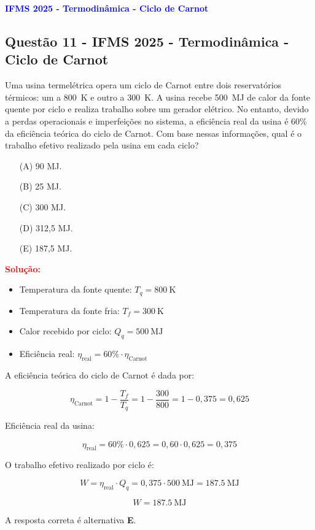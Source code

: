 \begin{flushleft}
\textbf{\textcolor{blue}{\Large IFMS 2025 - Termodinâmica - Ciclo de Carnot}}\\
\noindent

\subsection{Quest\~ao 11 - IFMS 2025 - Termodinâmica - Ciclo de Carnot}
Uma usina termelétrica opera um \colorbox{yellow!50}{ciclo de Carnot} entre dois reservatórios térmicos: um a 
\SI{800}{\kelvin} e outro a \SI{300}{\kelvin}. A usina recebe \SI{500}{\mega\joule} de calor da 
fonte quente por ciclo e realiza trabalho sobre um gerador elétrico. No entanto, devido a perdas 
operacionais e imperfeições no sistema, a eficiência real da usina é 60\% da eficiência teórica do ciclo 
de Carnot. Com base nessas informações, qual é o trabalho efetivo realizado pela usina em cada ciclo?

\begin{itemize}
\item[(A)] 90 MJ.
\item[(B)] 25 MJ.
\item[(C)] 300 MJ.
\item[(D)] 312,5 MJ.
\item[(E)] 187,5 MJ.
\end{itemize}

\vspace{0.5cm}

\textcolor{red}{\textbf{Solução:}}\\

\begin{itemize}
    \item Temperatura da fonte quente: \( T_q = \SI{800}{\kelvin} \)
    \item Temperatura da fonte fria: \( T_f = \SI{300}{\kelvin} \)
    \item Calor recebido por ciclo: \( Q_q = \SI{500}{\mega\joule} \)
    \item Eficiência real: \( \eta_{\text{real}} = 60\% \cdot \eta_{\text{Carnot}} \)
\end{itemize}

\vspace{1em}
A eficiência teórica do ciclo de Carnot é dada por:

\[
\eta_{\text{Carnot}} = 1 - \frac{T_f}{T_q} = 1 - \frac{300}{800} = 1 - 0{,}375 = 0{,}625
\]

Eficiência real da usina:

\[
\eta_{\text{real}} = 60\% \cdot 0{,}625 = 0{,}60 \cdot 0{,}625 = 0{,}375
\]

O trabalho efetivo realizado por ciclo é:

\[
W = \eta_{\text{real}} \cdot Q_q = 0{,}375 \cdot \SI{500}{\mega\joule} = \SI{187.5}{\mega\joule}
\]

\[
\boxed{W = \SI{187.5}{\mega\joule}}
\]

A resposta correta é alternativa \colorbox{green!50}{\textbf{E}}.

\end{flushleft}

